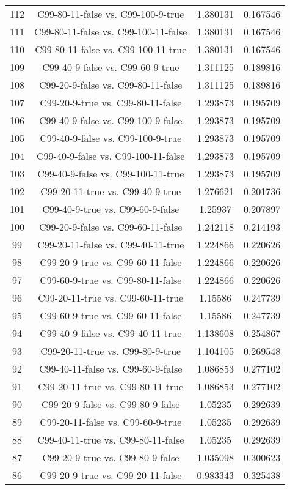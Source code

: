 \documentclass[a4paper,10pt]{article}
\begin{document}
\begin{landscape}
\begin{table}[!htp]
\begin{tabular}{cccc}
112&C99-80-11-false vs. C99-100-9-true&1.380131&0.167546\\
111&C99-80-11-false vs. C99-100-11-false&1.380131&0.167546\\
110&C99-80-11-false vs. C99-100-11-true&1.380131&0.167546\\
109&C99-40-9-false vs. C99-60-9-true&1.311125&0.189816\\
108&C99-20-9-false vs. C99-80-11-false&1.311125&0.189816\\
107&C99-20-9-true vs. C99-80-11-false&1.293873&0.195709\\
106&C99-40-9-false vs. C99-100-9-false&1.293873&0.195709\\
105&C99-40-9-false vs. C99-100-9-true&1.293873&0.195709\\
104&C99-40-9-false vs. C99-100-11-false&1.293873&0.195709\\
103&C99-40-9-false vs. C99-100-11-true&1.293873&0.195709\\
102&C99-20-11-true vs. C99-40-9-true&1.276621&0.201736\\
101&C99-40-9-true vs. C99-60-9-false&1.25937&0.207897\\
100&C99-20-9-false vs. C99-60-11-false&1.242118&0.214193\\
99&C99-20-11-false vs. C99-40-11-true&1.224866&0.220626\\
98&C99-20-9-true vs. C99-60-11-false&1.224866&0.220626\\
97&C99-60-9-true vs. C99-80-11-false&1.224866&0.220626\\
96&C99-20-11-true vs. C99-60-11-true&1.15586&0.247739\\
95&C99-60-9-true vs. C99-60-11-false&1.15586&0.247739\\
94&C99-40-9-false vs. C99-40-11-true&1.138608&0.254867\\
93&C99-20-11-true vs. C99-80-9-true&1.104105&0.269548\\
92&C99-40-11-false vs. C99-60-9-false&1.086853&0.277102\\
91&C99-20-11-true vs. C99-80-11-true&1.086853&0.277102\\
90&C99-20-9-false vs. C99-80-9-false&1.05235&0.292639\\
89&C99-20-11-false vs. C99-60-9-true&1.05235&0.292639\\
88&C99-40-11-true vs. C99-80-11-false&1.05235&0.292639\\
87&C99-20-9-true vs. C99-80-9-false&1.035098&0.300623\\
86&C99-20-9-true vs. C99-20-11-false&0.983343&0.325438\\

\end{tabular}
\end{table}
\end{landscape}
\end{document}
